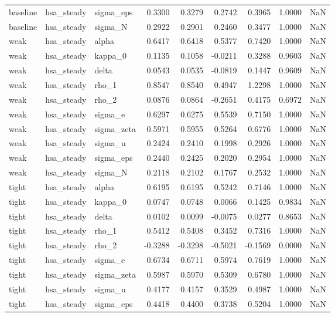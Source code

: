 \begin{tabular}{lllrrrrrl}
baseline & hsa\_steady & sigma\_eps & 0.3300 & 0.3279 & 0.2742 & 0.3965 & 1.0000 & NaN \\
baseline & hsa\_steady & sigma\_N & 0.2922 & 0.2901 & 0.2460 & 0.3477 & 1.0000 & NaN \\
weak & hsa\_steady & alpha & 0.6417 & 0.6418 & 0.5377 & 0.7420 & 1.0000 & NaN \\
weak & hsa\_steady & kappa\_0 & 0.1135 & 0.1058 & -0.0211 & 0.3288 & 0.9603 & NaN \\
weak & hsa\_steady & delta & 0.0543 & 0.0535 & -0.0819 & 0.1447 & 0.9609 & NaN \\
weak & hsa\_steady & rho\_1 & 0.8547 & 0.8540 & 0.4947 & 1.2298 & 1.0000 & NaN \\
weak & hsa\_steady & rho\_2 & 0.0876 & 0.0864 & -0.2651 & 0.4175 & 0.6972 & NaN \\
weak & hsa\_steady & sigma\_e & 0.6297 & 0.6275 & 0.5539 & 0.7150 & 1.0000 & NaN \\
weak & hsa\_steady & sigma\_zeta & 0.5971 & 0.5955 & 0.5264 & 0.6776 & 1.0000 & NaN \\
weak & hsa\_steady & sigma\_u & 0.2424 & 0.2410 & 0.1998 & 0.2926 & 1.0000 & NaN \\
weak & hsa\_steady & sigma\_eps & 0.2440 & 0.2425 & 0.2020 & 0.2954 & 1.0000 & NaN \\
weak & hsa\_steady & sigma\_N & 0.2118 & 0.2102 & 0.1767 & 0.2532 & 1.0000 & NaN \\
tight & hsa\_steady & alpha & 0.6195 & 0.6195 & 0.5242 & 0.7146 & 1.0000 & NaN \\
tight & hsa\_steady & kappa\_0 & 0.0747 & 0.0748 & 0.0066 & 0.1425 & 0.9834 & NaN \\
tight & hsa\_steady & delta & 0.0102 & 0.0099 & -0.0075 & 0.0277 & 0.8653 & NaN \\
tight & hsa\_steady & rho\_1 & 0.5412 & 0.5408 & 0.3452 & 0.7316 & 1.0000 & NaN \\
tight & hsa\_steady & rho\_2 & -0.3288 & -0.3298 & -0.5021 & -0.1569 & 0.0000 & NaN \\
tight & hsa\_steady & sigma\_e & 0.6734 & 0.6711 & 0.5974 & 0.7619 & 1.0000 & NaN \\
tight & hsa\_steady & sigma\_zeta & 0.5987 & 0.5970 & 0.5309 & 0.6780 & 1.0000 & NaN \\
tight & hsa\_steady & sigma\_u & 0.4177 & 0.4157 & 0.3529 & 0.4987 & 1.0000 & NaN \\
tight & hsa\_steady & sigma\_eps & 0.4418 & 0.4400 & 0.3738 & 0.5204 & 1.0000 & NaN \\

\end{tabular}

